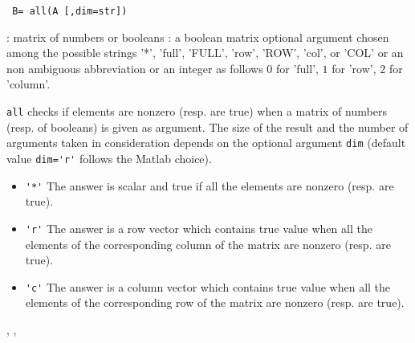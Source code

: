 \begin{mandesc}
\end{mandesc}

\begin{calling_sequence}
\begin{verbatim}
 B= all(A [,dim=str])
\end{verbatim}
\end{calling_sequence}
\begin{parameters}
  \begin{varlist}
    :  matrix of numbers or booleans 
    : a boolean matrix 
     optional argument chosen among the possible strings '*', 
    'full', 'FULL', 'row', 'ROW', 'col', or 'COL'  or an non ambiguous abbreviation or an 
    integer as follows $0$ for 'full', $1$ for 'row', $2$ for 'column'.
  \end{varlist}
\end{parameters}

\begin{mandescription}
  \verb!all! checks if elements are nonzero (resp. are true) when a matrix of numbers (resp. of booleans) 
  is given as argument. The size of the result and the number of arguments taken in consideration depends 
  on the optional argument \verb!dim! (default value \verb!dim='r'! follows the Matlab choice). 
  \begin{itemize}
  \item \verb!'*'! The answer is scalar and true if all the elements are nonzero (resp. are true).
  \item \verb!'r'! The answer is a row vector which contains true value when all the elements of 
    the corresponding column of the matrix are  nonzero (resp. are true). 
  \item \verb!'c'! The answer is a column vector which contains true value when all the elements of 
    the corresponding row of the matrix are  nonzero (resp. are true).
  \end{itemize}
\end{mandescription}
\begin{manseealso}
  , , 
\end{manseealso}


